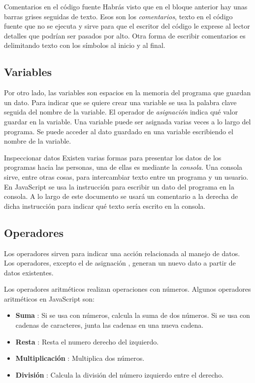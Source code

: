 \documentclass{article}
\newcommand{\code}[1]{\tcbox{\texttt{#1}}}
\newcommand{\codejs}[1]{\tcbox{\lstinline[style=ES6]{#1}}}
\newcommand{\operator}[2]{\item \textbf{#1} \codejs{#2}:}
\newcommand{\jsfile}[2]{}
\newenvironment{info}[1]
  {\begin{bclogo}[logo=\bcinfo, couleurBarre=orange, noborder=true, couleur=white]{#1}}
  {\end{bclogo}}
\begin{document}
\jsfile{Ejemplos de datos primitivos}{code/primitives.js}

\begin{info}{Comentarios en el código fuente}
Habrás visto que en el bloque anterior hay unas barras grises \code{//} seguidas de texto. Esos son los \textit{comentarios}, texto en el código fuente que no se ejecuta y sirve para que el escritor del código le exprese al lector detalles que podrían ser pasados por alto.
\newline
Otra forma de escribir comentarios es delimitando texto con los símbolos \code{/*} al inicio y \code{*/} al final.
\end{info}

\subsection{Variables}
Por otro lado, las variables son espacios en la memoria del programa que guardan un dato. Para indicar que se quiere crear una variable se usa la palabra clave \codejs{let} seguida del nombre de la variable. El operador de \textit{asignación} \codejs{=} indica qué valor guardar en la variable. Una variable puede ser asignada varias veces a lo largo del programa. Se puede acceder al dato guardado en una variable escribiendo el nombre de la variable.

\jsfile{Ejemplo de variables}{code/variables.js}

\begin{info}{Inspeccionar datos}
Existen varias formas para presentar los datos de los programas hacia las personas, una de ellas es mediante la \textit{consola}. Una consola sirve, entre otras cosas, para intercambiar texto entre un programa y un usuario. En JavaScript se usa la instrucción \codejs{console.log( /* dato */ )} para escribir un dato del programa en la consola. A lo largo de este documento se usará un comentario a la derecha de dicha instrucción para indicar qué texto sería escrito en la consola.
\end{info}

\subsection{Operadores}
Los operadores sirven para indicar una acción relacionada al manejo de datos. Los operadores, excepto el de asignación \code{=}, generan un nuevo dato a partir de datos existentes.

\medskip
Los operadores aritméticos realizan operaciones con números. Algunos operadores aritméticos en JavaScript son:
\begin{itemize}
  \operator{Suma}{+} Si se usa con números, calcula la suma de dos números. Si se usa con cadenas de caracteres, junta las cadenas en una nueva cadena.
  \operator{Resta}{-} Resta el numero derecho del izquierdo.
  \operator{Multiplicación}{*} Multiplica dos números.
  \operator{División}{/} Calcula la división del número izquierdo entre el derecho.
\end{itemize}
\jsfile{Operadores aritméticos}{code/operators/arithmetic.js}
\end{document}
